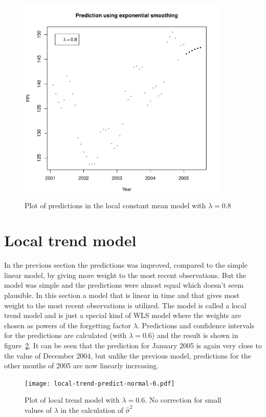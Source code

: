 \documentclass[11pt]{article}
\begin{document}
\begin{figure}
    \centering
    \includegraphics[width=100mm]{exp-smoothing-lambda-8.pdf}
    \caption{Plot of predictions in the local constant mean model with $\lambda=0.8$}
    \label{fig:local-constant-8}
\end{figure}

\pagebreak

\section*{Local trend model}
In the previous section the predictions was improved, compared to the simple linear model, by giving more weight to the most recent observations. But the model was simple and the predictions were almost equal which doesn't seem plausible. In this section a model that is linear in time and that gives most weight to the most recent observations is utilized. The model is called a local trend model and is just a special kind of WLS model where the weights are chosen as powers of the forgetting factor $\lambda$. Predictions and confidence intervals for the predictions are calculated (with $\lambda=0.6$) and the result is shown in figure~\ref{fig:local-trend-model-normal}. It can be seen that the prediction for January 2005 is again very close to the value of December 2004, but unlike the previous model, predictions for the other months of 2005 are now linearly increasing. 

\begin{figure}
    \centering
    \texttt{[image: local-trend-predict-normal-6.pdf]}
    \caption{Plot of local trend model with $\lambda=0.6$. No correction for small values of $\lambda$ in the calculation of $\widehat{\sigma}^2$}
    \label{fig:local-trend-model-normal}
\end{figure}
\end{document}

